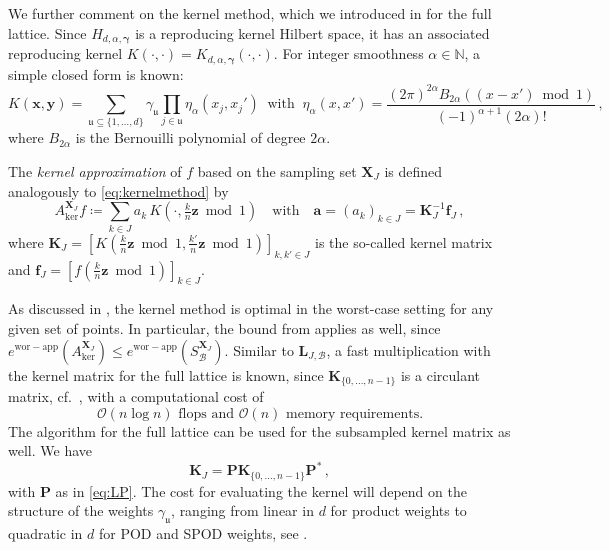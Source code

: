 \documentclass[a4paper]{amsart}
\newcommand{\ewc}{e^{\mathrm{wor-app}}}
\newcommand{\modone}{\bmod{}1}
\begin{document}
We further comment on the kernel method, which we introduced in  for the full lattice.
Since $H_{d, \alpha, \bm\gamma}$ is a reproducing kernel Hilbert space, it has an associated reproducing kernel $K(\cdot,\cdot) = K_{d,\alpha,\bm\gamma}(\cdot,\cdot)$.
For integer smoothness $\alpha\in\mathds N$, a simple closed form is known:
\begin{equation*}
    K(\bm x,\bm y)
    = \!\! \sum_{\mathfrak u\subseteq\{1,\dots,d\}} \!\! \gamma_{\mathfrak u} \prod_{j\in\mathfrak u} \eta_{\alpha}(x_j,x_j')
    \;\;\text{with}\;\;
    \eta_{\alpha}(x,x')
    = \frac{(2\pi)^{2\alpha} B_{2\alpha}((x-x')\modone)}{(-1)^{\alpha+1}(2\alpha)!} \,,
\end{equation*}
where $B_{2\alpha}$ is the Bernouilli polynomial of degree $2\alpha$.

The \emph{kernel approximation} of $f$ based on the sampling set $\bm X_J$ is defined analogously to \eqref{eq:kernelmethod} by
\begin{equation}\label{eq:subkernelmethod}
    A_{\text{ker}}^{\bm X_J}f
    \coloneqq \sum_{k\in J} a_k \, K(\cdot,\tfrac kn\bm z\modone)
    \quad\text{with}\quad
    \bm a = (a_k)_{k\in J} = \bm K_{J}^{-1}\bm f_J \,,
\end{equation}
where $\bm K_J = [K(\tfrac kn\bm z\modone, \tfrac{k'}{n}\bm z\modone)]_{k,k'\in J}$ is the so-called kernel matrix and $\bm f_J = [f(\tfrac kn\bm z\modone)]_{k\in J}$.

As discussed in , the kernel method is optimal in the worst-case setting for any given set of points.
In particular, the bound from  applies as well, since $\ewc(A_{\text{ker}}^{\bm X_J}) \le \ewc(S_{\mathcal B}^{\bm X_J})$.
Similar to $\bm L_{J,\mathcal B}$, a fast multiplication with the kernel matrix for the full lattice is known, since $\bm K_{\{0,\dots,n-1\}}$ is a circulant matrix, cf.\ \cite[Table~1]{KKKNS21}, with a computational cost of
\begin{equation*}
    \mathcal O(n\log n) \text{ flops and } \mathcal O(n) \text{ memory requirements}.
\end{equation*}
The algorithm for the full lattice can be used for the subsampled kernel matrix as well.
We have
\begin{equation*}
    \bm K_J = \bm P \bm K_{\{0,\dots,n-1\}} \bm P^\ast \,,
\end{equation*}
with $\bm P$ as in \eqref{eq:LP}.
The cost for evaluating the kernel will depend on the structure of the weights $\gamma_{\mathfrak u}$, ranging from linear in $d$ for product weights to quadratic in $d$ for POD and SPOD weights, see \cite[Table~1]{KKKNS21}.
\end{document}
